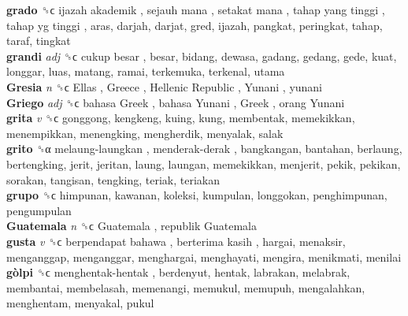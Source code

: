 \textbf{grado} ␝ϲ   ijazah akademik ,  sejauh mana ,  setakat mana ,  tahap yang tinggi ,  tahap yg tinggi , aras, darjah, darjat, gred, ijazah, pangkat, peringkat, tahap, taraf, tingkat  \\
\textbf{grandi} \emph{adj}  ␝ϲ   cukup besar , besar, bidang, dewasa, gadang, gedang, gede, kuat, longgar, luas, matang, ramai, terkemuka, terkenal, utama  \\
\textbf{Gresia} \emph{n}  ␝ϲ   Ellas ,  Greece ,  Hellenic Republic ,  Yunani , yunani  \\
\textbf{Griego} \emph{adj}  ␝ϲ   bahasa Greek ,  bahasa Yunani ,  Greek ,  orang Yunani   \\
\textbf{grita} \emph{v}  ␝ϲ  gonggong, kengkeng, kuing, kung, membentak, memekikkan, menempikkan, menengking, mengherdik, menyalak, salak  \\
\textbf{grito} ␝α   melaung-laungkan ,  menderak-derak , bangkangan, bantahan, berlaung, bertengking, jerit, jeritan, laung, laungan, memekikkan, menjerit, pekik, pekikan, sorakan, tangisan, tengking, teriak, teriakan  \\
\textbf{grupo} ␝ϲ  himpunan, kawanan, koleksi, kumpulan, longgokan, penghimpunan, pengumpulan  \\
\textbf{Guatemala} \emph{n}  ␝ϲ   Guatemala ,  republik Guatemala   \\
\textbf{gusta} \emph{v}  ␝ϲ   berpendapat bahawa ,  berterima kasih , hargai, menaksir, menganggap, menganggar, menghargai, menghayati, mengira, menikmati, menilai  \\
\textbf{gòlpi} ␝ϲ   menghentak-hentak , berdenyut, hentak, labrakan, melabrak, membantai, membelasah, memenangi, memukul, memupuh, mengalahkan, menghentam, menyakal, pukul  \\
